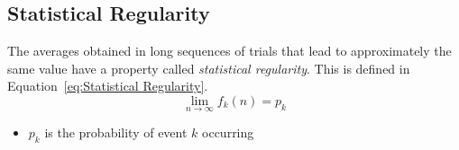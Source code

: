 	\subsection{Statistical Regularity} \label{subsec:Statistical Regularity}
		\begin{definition} \label{def:Statistical Regularity}
			The averages obtained in long sequences of trials that lead to approximately the same value have a property called \emph{statistical regularity}.
			This is defined in Equation~\eqref{eq:Statistical Regularity}.
			\begin{equation} \label{eq:Statistical Regularity}
				\lim\limits_{n \rightarrow \infty} f_k (n) = p_k
			\end{equation}
			\begin{itemize}[noitemsep, nolistsep]
				\item $p_k$ is the probability of event $k$ occurring
			\end{itemize}
		\end{definition}